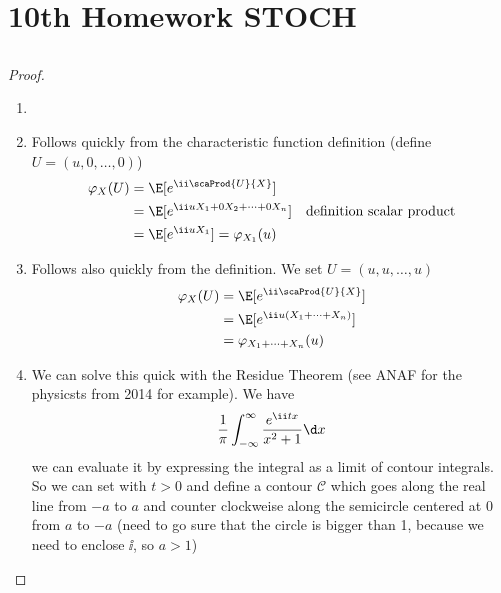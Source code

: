 
\section{10th Homework STOCH}
\subsection{}
\begin{proof}
	\begin{enumerate}
		\item 
		\item Follows quickly from the characteristic function definition (define $U= (u,0,\dots,0)$)
		\begin{align*}
			\varphi_X(U) &= \E[e^{\ii \scaProd{U}{X}}]\\
			&= \E[e^{\ii uX_1 + 0X_2 + \cdots + 0X_n}] \quad \text{definition scalar product}\\
			&= \E[e^{\ii uX_1}] = \varphi_{X_1}(u)
		\end{align*}
		\item Follows also quickly from the definition. We set $U = (u,u, \dots, u)$
		\begin{align*}
			\varphi_X(U) &= \E[e^{\ii \scaProd{U}{X}}]\\
			&= \E[e^{\ii u (X_1 + \cdots + X_n)}]\\
			&= \varphi_{X_1+\cdots+X_n}(u)
		\end{align*}
		\item We can solve this quick with the Residue Theorem (see ANAF for the physicsts from 2014 for example). We have
		\begin{align*}
		\frac{1}{\pi}\int_{-\infty}^{\infty} \frac{e^{\ii t x}}{x^2+1} \d x
		\end{align*}
		we can evaluate it by expressing the integral as a limit of contour integrals. So we can set with $t>0$ and define a contour $\mathscr{C}$ which goes along the real line from $-a$ to $a$ and counter clockweise along the semicircle centered at 0 from $a$ to $-a$ (need to go sure that the circle is bigger than 1, because we need to enclose $\ii$, so $a > 1$)

\end{enumerate}
\end{proof}
